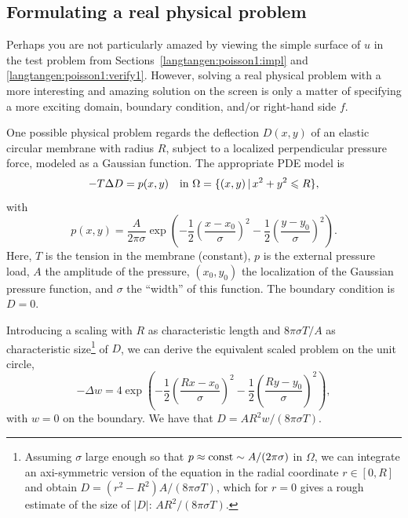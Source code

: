 \subsection{Formulating a real physical problem}
\label{langtangen:poisson:membrane}

Perhaps you are not particularly amazed by viewing the simple surface
of $u$ in the test problem from Sections~\ref{langtangen:poisson1:impl}
and \ref{langtangen:poisson1:verify1}.  However, solving a real physical
problem with a more interesting and amazing solution on the screen is
only a matter of specifying a more exciting domain, boundary condition,
and/or right-hand side $f$.

One possible physical problem regards the deflection $D(x,y)$ of an
elastic circular membrane with radius $R$, subject to a localized
perpendicular pressure force, modeled as a Gaussian function.
The appropriate PDE model is
\begin{equation}
-T\Delta D = p(x,y)\quad\hbox{in }\Omega = \{ (x,y)\,|\, x^2+y^2\leqslant R\},
\end{equation}
with
\begin{equation}
p(x,y) = \frac{A}{2\pi\sigma}\exp{\left(
- \frac{1}{2}\left( \frac{x-x_0}{\sigma}\right)^2
- \frac{1}{2}\left( \frac{y-y_0}{\sigma}\right)^2
\right)}.
\end{equation}
Here, $T$ is the tension in the membrane (constant), $p$ is the
external pressure load, $A$ the amplitude of the pressure, $(x_0,y_0)$
the localization of the Gaussian pressure function, and $\sigma$ the
``width'' of this function. The boundary condition is $D=0$.

Introducing a scaling with $R$ as characteristic length and $8\pi\sigma
T/A$ as characteristic size\footnote{ Assuming $\sigma$ large enough
so that $p\approx\hbox{const} \sim A/(2\pi\sigma)$ in $\Omega$, we
can integrate an axi-symmetric version of the equation in the radial
coordinate $r\in [0,R]$ and obtain $D=(r^2-R^2)A/(8\pi\sigma T)$, which
for $r=0$ gives a rough estimate of the size of $|D|$: $AR^2/(8\pi\sigma
T)$.}
 of $D$, we can derive the equivalent
scaled problem on the unit circle,
\begin{equation}
\label{langtangen:poisson1:membrane:scaled:eq}
-\Delta w =
4\exp{\left(
- \frac{1}{2}\left( \frac{Rx-x_0}{\sigma}\right)^2
- \frac{1}{2}\left( \frac{Ry-y_0}{\sigma}\right)^2
\right)},
\end{equation}
with $w=0$ on the boundary. We have that $D = AR^2w/(8\pi\sigma T)$.

